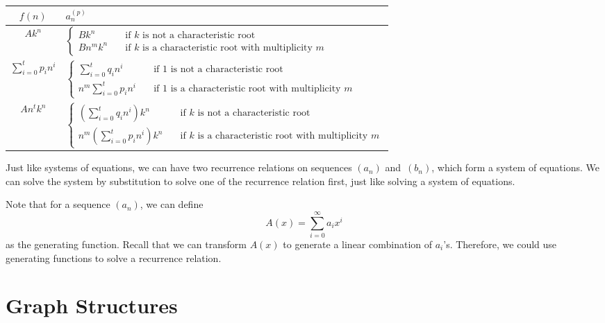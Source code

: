 \documentclass[math]{amznotes}
\theoremstyle{remark}
\begin{document}
\begin{center}
    \begin{tabular}{|c|l|}
        \hline
        $f(n)$ &  $a_n^{(p)}$ \\
        \hline
        $Ak^n$ & $\begin{cases}
            Bk^n & \quad\textrm{if } k \textrm{ is not a characteristic root} \\
            Bn^mk^n & \quad\textrm{if } k \textrm{ is a characteristic root with multiplicity } m
        \end{cases}$ \\
        \hline
        $\sum_{i = 0}^{t}p_in^i$ & $\begin{cases}
            \sum_{i = 0}^{t}q_in^i & \quad\textrm{if } 1 \textrm{ is not a characteristic root} \\
            n^m\sum_{i = 0}^{t}p_in^i & \quad\textrm{if } 1 \textrm{ is a characteristic root with multiplicity } m
        \end{cases}$ \\
        \hline
        $An^tk^n$ & $\begin{cases}
            \left(\sum_{i = 0}^{t}q_in^i\right)k^n & \quad\textrm{if } k \textrm{ is not a characteristic root} \\
            n^m\left(\sum_{i = 0}^{t}p_in^i\right)k^n & \quad\textrm{if } k \textrm{ is a characteristic root with multiplicity } m
        \end{cases}$ \\
        \hline
    \end{tabular}
\end{center}
Just like systems of equations, we can have two recurrence relations on sequences $(a_n)$ and~$(b_n)$, which form a system of equations. We can solve the system by substitution to solve one of the recurrence relation first, just like solving a system of equations.

Note that for a sequence $(a_n)$, we can define
\begin{equation*}
    A(x) = \sum_{i = 0}^{\infty}a_ix^i
\end{equation*}
as the generating function. Recall that we can transform $A(x)$ to generate a linear combination of $a_i$'s. Therefore, we could use generating functions to solve a recurrence relation.

\chapter{Graph Structures}
\end{document}
